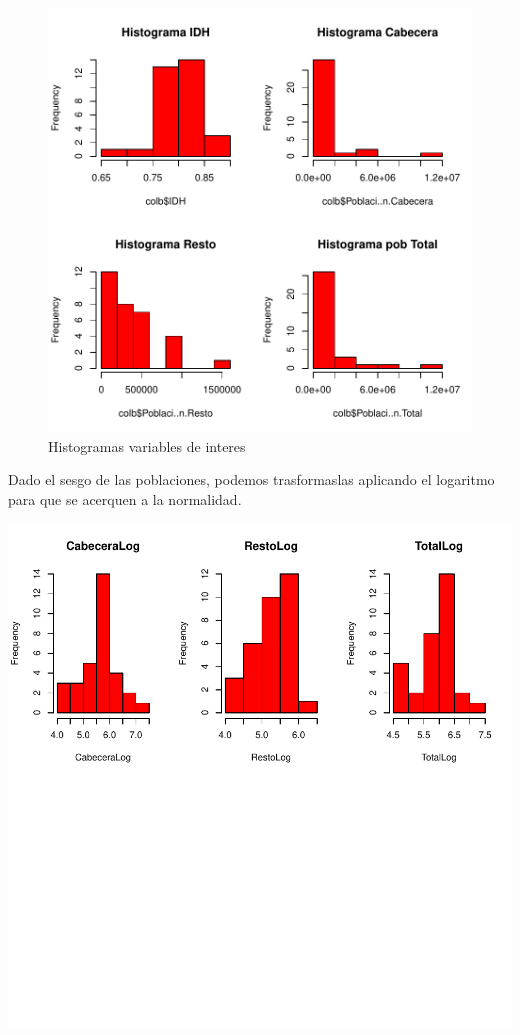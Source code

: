 \documentclass{article}
\begin{document}
\begin{figure}[h]
\centering

\includegraphics{ProyectoFinalJV-histogramas}

\caption{Histogramas variables de interes}
\label{histog}
\end{figure}

Dado el sesgo de las poblaciones, podemos trasformaslas aplicando el logaritmo para que se acerquen a la normalidad. 

\includegraphics{ProyectoFinalJV-HistogramasAjustados}
\end{document}
